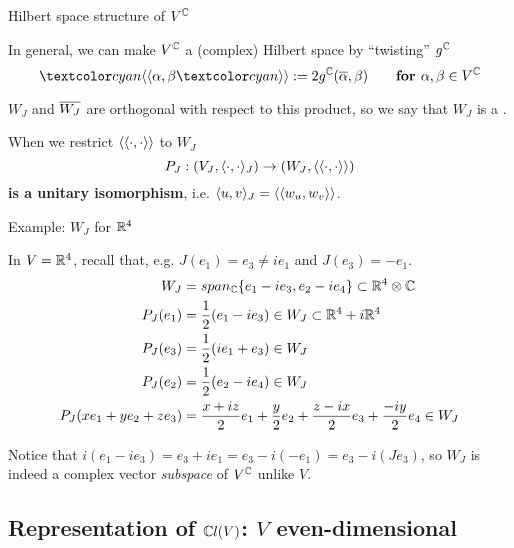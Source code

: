 \begin{frame}{Hilbert space structure of $V^\mathbb C$} %
    
    In general, we can make $V^\mathbb C$ a (complex) Hilbert space by ``twisting'' $g^\mathbb C$ \[ \defn{\bbra} \alpha, \beta \defn{\kket} := 2 g^\CC(\conj{\alpha}, \beta) \qquad \textbf{for } \alpha, \beta \in V^\CC \]
    
    $W_J$ and $\overline{W_J}$ are orthogonal with respect to this product, so we say that $W_J$ is a .
    
    When we restrict $\langle\langle \cdot , \cdot\rangle\rangle$ to $W_J$ \[P_J: (V_J, \langle \cdot, \cdot \rangle_J) \to (W_J, \langle\langle \cdot, \cdot \rangle\rangle) \] \textbf{is a unitary isomorphism}, i.e. $\langle u, v \rangle_J = \langle\langle w_u, w_v \rangle\rangle$.
    
\end{frame}

\begin{frame}{Example: $W_J$ for $\mathbb R^4$} %

    In $V = \mathbb R^4$, recall that, e.g. $J(e_1) = e_3 \neq ie_1$ and $J(e_3) = -e_1$.
    \begin{align*}
        W_J &= span_\mathbb C\{e_1 -i e_3, e_2 - ie_4\} \subset{\mathbb R^4 \otimes \mathbb C} \\
        P_J(e_1) &= \frac{1}{2}(e_1 - ie_3) \in W_J \subset \mathbb R^4 + i\mathbb R^4 \\
        P_J(e_3) &= \frac{1}{2}(ie_1 + e_3) \in W_J \\
        P_J(e_2) &= \frac{1}{2}(e_2 - ie_4) \in W_J \\
        P_J(x e_1 + y e_2 + z e_3) &= \frac{x + iz}{2}e_1 + \frac{y}{2}e_2 + \frac{z - ix}{2}e_3 + \frac{-iy}{2} e_4 \in W_J
    \end{align*}
    


Notice that $i(e_1 - i e_3) = e_3 + ie_1 = e_3 - i (-e_1) = e_3 - i (J e_3)$, so $W_J$ is indeed a complex vector \emph{subspace} of $V^\mathbb C$ unlike $V$.

\end{frame}

\subsection{Representation of $\mathbb C l(V)$: $V$ even-dimensional}


